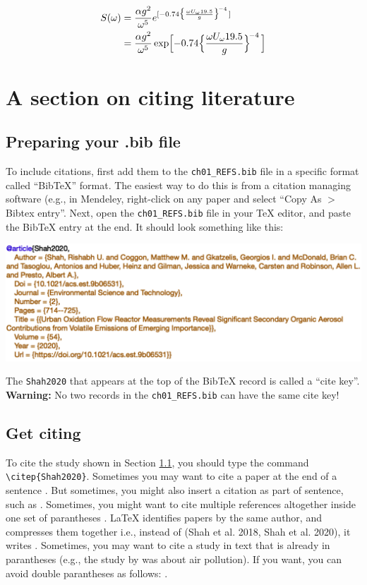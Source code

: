 \begin{align}
S(\omega)
&= \frac{\alpha g^2}{\omega^5} e^{[ -0.74\bigl\{\frac{\omega U_\omega 19.5}{g}\bigr\}^{\!-4}\,]}\label{eq-omega1-ch2} \\
&= \frac{\alpha g^2}{\omega^5} \exp\Bigl[ -0.74\Bigl\{\frac{\omega U_\omega 19.5}{g}\Bigr\}^{\!-4}\,\Bigr]\label{eq-omega2-ch2} 
\end{align}

\section{A section on citing literature}\label{citing-sec-ch2}
\subsection{Preparing your .bib file} \label{sec:prepping_bib-ch2}
To include citations, first add them to the \verb|ch01_REFS.bib| file in a specific format called ``BibTeX'' format. The easiest way to do this is from a citation managing software (e.g., in Mendeley, right-click on any paper and select ``Copy As $ > $ Bibtex entry''. Next, open the \verb|ch01_REFS.bib| file in your TeX editor, and paste the BibTeX entry at the end. It should look something like this:

\begin{center}
\includegraphics[width=\linewidth]{"ch02/bib_example"}
\end{center}

The \verb|Shah2020| that appears at the top of the BibTeX record is called a ``cite key''.
\textbf{Warning:} No two records in the \verb|ch01_REFS.bib| can have the same cite key!

\subsection{Get citing}
To cite the study shown in Section \ref{sec:prepping_bib-ch2}, you should type the command \verb|\citep{Shah2020}|. Sometimes you may want to cite a paper at the end of a sentence \citep{Shah2020}. But sometimes, you might also insert a citation as part of sentence, such as \citet{Shah2020}. Sometimes, you might want to cite multiple references altogether inside one set of parantheses \citep{Shah2018,Shah2020,Robinson2019}. \LaTeX{} identifies papers by the same author, and compresses them together i.e., instead of (Shah et al. 2018, Shah et al. 2020), it writes \citep{Shah2018,Shah2020}. Sometimes, you may want to cite a study in text that is already in parantheses (e.g., the study by \citep{Shah2018} was about air pollution). If you want, you can avoid double parantheses as follows: \cite[e.g., the study by][was about air pollution]{Shah2018}.

